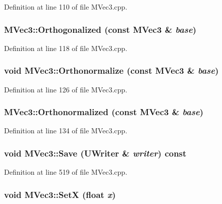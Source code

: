 Definition at line 110 of file MVec3.cpp.\hypertarget{class_m_vec3_d784fa93a877a935c5fdf37f9cd7a505}{
\subsubsection[{Orthogonalized}]{ MVec3::Orthogonalized (const {\bf MVec3} \& {\em base})}}
\label{class_m_vec3_d784fa93a877a935c5fdf37f9cd7a505}




Definition at line 118 of file MVec3.cpp.\hypertarget{class_m_vec3_65c10253d74af1520788361ca191cd50}{
\subsubsection[{Orthonormalize}]{\setlength{\rightskip}{0pt plus 5cm}void MVec3::Orthonormalize (const {\bf MVec3} \& {\em base})}}
\label{class_m_vec3_65c10253d74af1520788361ca191cd50}




Definition at line 126 of file MVec3.cpp.\hypertarget{class_m_vec3_90de66244ee48f99a07924deb28a9d35}{
\subsubsection[{Orthonormalized}]{ MVec3::Orthonormalized (const {\bf MVec3} \& {\em base})}}
\label{class_m_vec3_90de66244ee48f99a07924deb28a9d35}




Definition at line 134 of file MVec3.cpp.\hypertarget{class_m_vec3_6ed278b7804ea2eeb0f058a4534010e9}{
\subsubsection[{Save}]{\setlength{\rightskip}{0pt plus 5cm}void MVec3::Save ({\bf UWriter} \& {\em writer}) const}}
\label{class_m_vec3_6ed278b7804ea2eeb0f058a4534010e9}




Definition at line 519 of file MVec3.cpp.\hypertarget{class_m_vec3_7ab6073bcf8afbcf630ad8f2ae8992b8}{
\subsubsection[{SetX}]{\setlength{\rightskip}{0pt plus 5cm}void MVec3::SetX (float {\em x})}}
\label{class_m_vec3_7ab6073bcf8afbcf630ad8f2ae8992b8}




